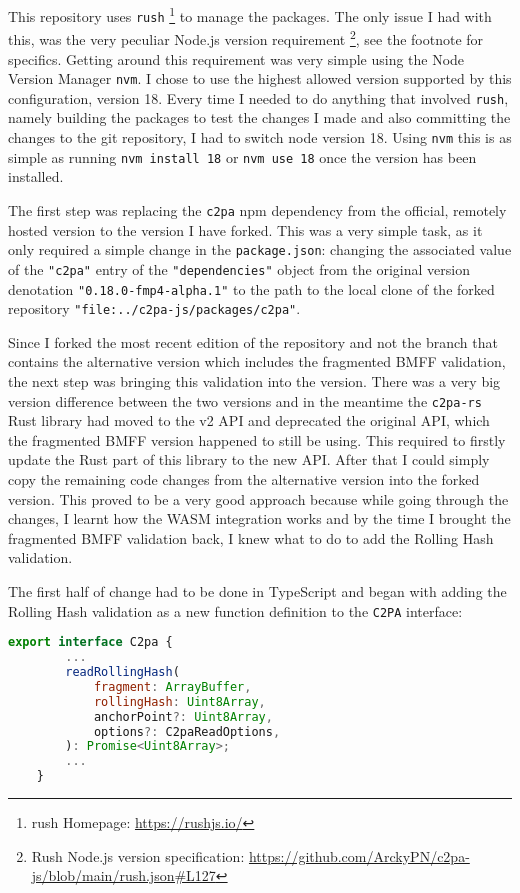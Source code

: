 This repository uses \texttt{rush} \footnote{rush Homepage: \url{https://rushjs.io/}} to manage the packages. The only issue I had with this, was the very peculiar Node.js version requirement \footnote{Rush Node.js version specification: \url{https://github.com/ArckyPN/c2pa-js/blob/main/rush.json\#L127}}, see the footnote for specifics. Getting around this requirement was very simple using the Node Version Manager \texttt{nvm}. I chose to use the highest allowed version supported by this configuration, version 18. Every time I needed to do anything that involved \texttt{rush}, namely building the packages to test the changes I made and also committing the changes to the git repository, I had to switch node version 18. Using \texttt{nvm} this is as simple as running \texttt{nvm install 18} or \texttt{nvm use 18} once the version has been installed.

The first step was replacing the \texttt{c2pa} npm dependency from the official, remotely hosted version to the version I have forked. This was a very simple task, as it only required a simple change in the \texttt{package.json}: changing the associated value of the \texttt{"c2pa"} entry of the \texttt{"dependencies"} object from the original version denotation \texttt{"0.18.0-fmp4-alpha.1"} to the path to the local clone of the forked repository \texttt{"file:../c2pa-js/packages/c2pa"}.

Since I forked the most recent edition of the repository and not the branch that contains the alternative version which includes the fragmented BMFF validation, the next step was bringing this validation into the version. There was a very big version difference between the two versions and in the meantime the \texttt{c2pa-rs} Rust library had moved to the v2 API and deprecated the original API, which the fragmented BMFF version happened to still be using. This required to firstly update the Rust part of this library to the new API. After that I could simply copy the remaining code changes from the alternative version into the forked version. This proved to be a very good approach because while going through the changes, I learnt how the WASM integration works and by the time I brought the fragmented BMFF validation back, I knew what to do to add the Rolling Hash validation.

The first half of change had to be done in TypeScript and began with adding the Rolling Hash validation as a new function definition to the \texttt{C2PA} interface:

\begin{minipage}{0.95\linewidth}
\begin{lstlisting}[caption={New Rolling Hash Validation Function}, label=code:rh_validate, language=JavaScript, captionpos=b]
    export interface C2pa {
        ...
        readRollingHash(
            fragment: ArrayBuffer,
            rollingHash: Uint8Array,
            anchorPoint?: Uint8Array,
            options?: C2paReadOptions,
        ): Promise<Uint8Array>;
        ...
    }
\end{lstlisting}
\end{minipage}

